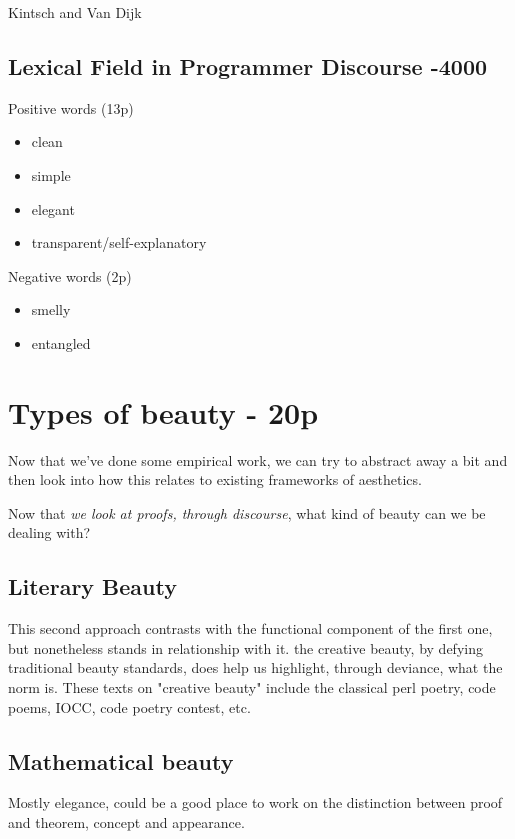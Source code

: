 {Kintsch and Van Dijk

\subsection{Lexical Field in Programmer Discourse -4000}

Positive words (13p)

\begin{itemize}
    \item clean
    \item simple
    \item elegant
    \item transparent/self-explanatory
\end{itemize}

Negative words (2p)

\begin{itemize}
    \item smelly
    \item entangled
\end{itemize}

\section{Types of beauty  - 20p}

Now that we've done some empirical work, we can try to abstract away a bit and then look into how this relates to existing frameworks of aesthetics. 

Now that \emph{we look at proofs, through discourse}, what kind of beauty can we be dealing with?

\subsection{Literary Beauty}

This second approach contrasts with the functional component of the first one, but nonetheless stands in relationship with it. the creative beauty, by defying traditional beauty standards, does help us highlight, through deviance, what the norm is. These texts on "creative beauty" include the classical perl poetry, code poems, IOCC, code poetry contest, etc.

\subsection{Mathematical beauty}

Mostly elegance, could be a good place to work on the distinction between proof and theorem, concept and appearance.

}
